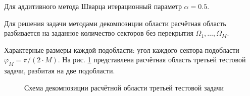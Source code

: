 \documentclass[a4paper]{article}
\begin{document}
Для аддитивного метода Шварца итерационный параметр $\alpha = 0.5$.

\newpage

Для решения задачи методами декомпозиции области расчётная область разбивается на заданное количество секторов без перекрытия $\Omega_1, \ldots, \Omega_M$. 

Характерные размеры каждой подобласти: угол каждого сектора-подобласти $\varphi_M = \pi / (2 \cdot M)$. На рис. \ref{fig:task_04_decomposition} представлена расчётная область третьей тестовой задачи, разбитая на две подобласти.

\begin{figure}[h]
\caption{Схема декомпозиции расчётной области третьей тестовой задачи}
\label{fig:task_04_decomposition}
\end{figure}
\end{document}
